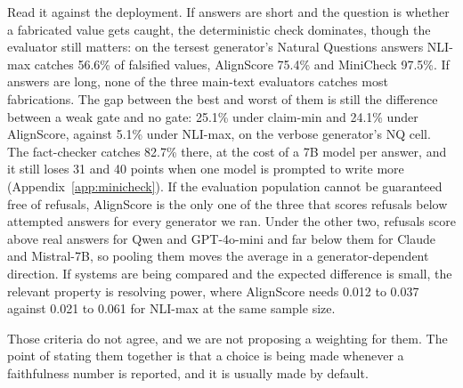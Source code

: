 Read it against the deployment. If answers are short and the question is whether a fabricated value gets caught, the deterministic check dominates, though the evaluator still matters: on the tersest generator's Natural Questions answers NLI-max catches 56.6\% of falsified values, AlignScore 75.4\% and MiniCheck 97.5\%. If answers are long, none of the three main-text evaluators catches most fabrications. The gap between the best and worst of them is still the difference between a weak gate and no gate: 25.1\% under claim-min and 24.1\% under AlignScore, against 5.1\% under NLI-max, on the verbose generator's NQ cell. The fact-checker catches 82.7\% there, at the cost of a 7B model per answer, and it still loses 31 and 40 points when one model is prompted to write more (Appendix~\ref{app:minicheck}). If the evaluation population cannot be guaranteed free of refusals, AlignScore is the only one of the three that scores refusals below attempted answers for every generator we ran. Under the other two, refusals score above real answers for Qwen and GPT-4o-mini and far below them for Claude and Mistral-7B, so pooling them moves the average in a generator-dependent direction. If systems are being compared and the expected difference is small, the relevant property is resolving power, where AlignScore needs 0.012 to 0.037 against 0.021 to 0.061 for NLI-max at the same sample size.

Those criteria do not agree, and we are not proposing a weighting for them. The point of stating them together is that a choice is being made whenever a faithfulness number is reported, and it is usually made by default.
